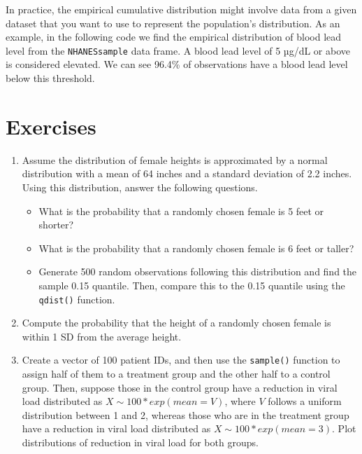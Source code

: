 \documentclass[
  letterpaper,
]{latex/krantz}
\makeatletter
\newenvironment{Shaded}{\begin{snugshade}}{\end{snugshade}}
\newcommand{\CommentTok}[1]{\textcolor[rgb]{0.37,0.37,0.37}{#1}}
\newcommand{\DecValTok}[1]{\textcolor[rgb]{0.68,0.00,0.00}{#1}}
\newcommand{\FunctionTok}[1]{\textcolor[rgb]{0.28,0.35,0.67}{#1}}
\newcommand{\NormalTok}[1]{\textcolor[rgb]{0.00,0.23,0.31}{#1}}
\newcommand{\OtherTok}[1]{\textcolor[rgb]{0.00,0.23,0.31}{#1}}
\newcommand{\SpecialCharTok}[1]{\textcolor[rgb]{0.37,0.37,0.37}{#1}}
\newenvironment{kframe}{%
\medskip{}
\setlength{\fboxsep}{.8em}
 \def\at@end@of@kframe{}%
 \ifinner\ifhmode%
  \def\at@end@of@kframe{\end{minipage}}%
  \begin{minipage}{\columnwidth}%
 \fi\fi%
 \def\FrameCommand##1{\hskip\@totalleftmargin \hskip-\fboxsep
 \colorbox{shadecolor}{##1}\hskip-\fboxsep
     \hskip-\linewidth \hskip-\@totalleftmargin \hskip\columnwidth}%
 \MakeFramed {\advance\hsize-\width
   \@totalleftmargin\z@ \linewidth\hsize
   \@setminipage}}%
 {\par\unskip\endMakeFramed%
 \at@end@of@kframe}
\renewenvironment{Shaded}{\begin{kframe}}{\end{kframe}}
\makeatother
\begin{document}
In practice, the empirical cumulative distribution might involve data
from a given dataset that you want to use to represent the population's
distribution. As an example, in the following code we find the empirical
distribution of blood lead level from the \texttt{NHANESsample} data
frame. A blood lead level of 5 µg/dL or above is considered elevated. We
can see 96.4\% of observations have a blood lead level below this
threshold.

\begin{Shaded}
\end{Shaded}

\section{Exercises}\label{exercises-6}

\begin{enumerate}
\def\labelenumi{\arabic{enumi}.}
\item
  Assume the distribution of female heights is approximated by a normal
  distribution with a mean of 64 inches and a standard deviation of 2.2
  inches. Using this distribution, answer the following questions.

  \begin{itemize}
  \item
    What is the probability that a randomly chosen female is 5 feet or
    shorter?
  \item
    What is the probability that a randomly chosen female is 6 feet or
    taller?
  \item
    Generate 500 random observations following this distribution and
    find the sample 0.15 quantile. Then, compare this to the 0.15
    quantile using the \texttt{qdist()} function.
  \end{itemize}
\item
  Compute the probability that the height of a randomly chosen female is
  within 1 SD from the average height.
\item
  Create a vector of 100 patient IDs, and then use the \texttt{sample()}
  function to assign half of them to a treatment group and the other
  half to a control group. Then, suppose those in the control group have
  a reduction in viral load distributed as \(X \sim 100*exp(mean = V)\),
  where \(V\) follows a uniform distribution between 1 and 2, whereas
  those who are in the treatment group have a reduction in viral load
  distributed as \(X \sim 100*exp(mean = 3)\). Plot distributions of
  reduction in viral load for both groups.
\end{enumerate}
\end{document}
